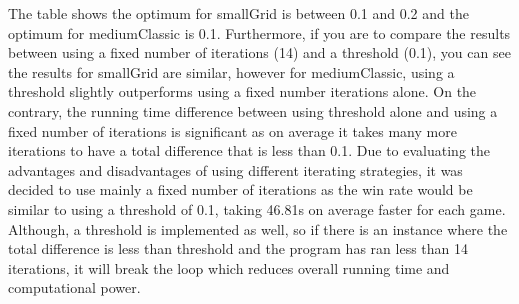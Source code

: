\documentclass[12pt]{report}
\begin{document}
          The table shows the optimum for smallGrid is between 0.1 and 0.2 and the optimum for mediumClassic is 0.1. Furthermore, if you are to compare the results between using a fixed number of iterations (14) and a threshold (0.1), you can see the results for smallGrid are similar, however for mediumClassic, using a threshold slightly outperforms using a fixed number iterations alone. On the contrary, the running time difference between using threshold alone and using a fixed number of iterations is significant as on average it takes many more iterations to have a total difference that is less than 0.1. Due to evaluating the advantages and disadvantages of using different iterating strategies, it was decided to use mainly a fixed number of iterations as the win rate would be similar to using a threshold of 0.1, taking 46.81s on average faster for each game. Although, a threshold is implemented as well, so if there is an instance where the total difference is less than threshold and the program has ran less than 14 iterations, it will break the loop which reduces overall running time and computational power.
\end{document}
